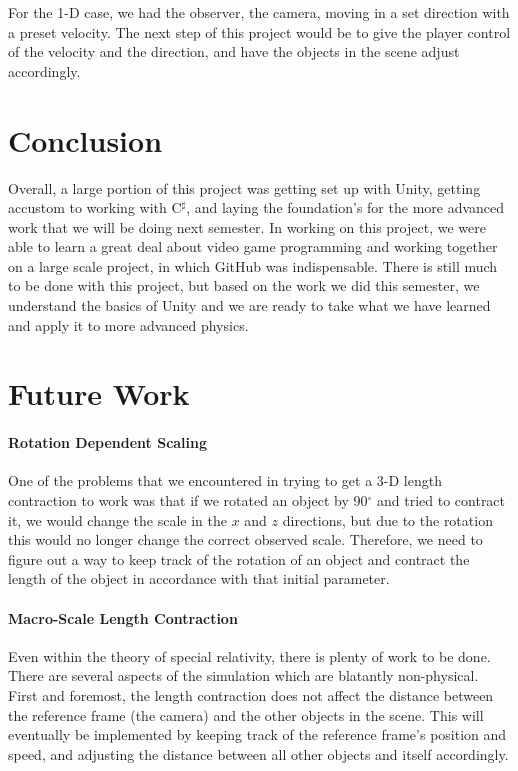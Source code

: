 \documentclass[12pt]{article}
\newcommand{\csharp}{C$^\sharp$}
\begin{document}
For the 1-D case, we had the observer, the camera, moving in a set direction with a preset velocity. The next step of this project would be to give the player control of the velocity and the direction, and have the objects in the scene adjust accordingly.

\section{Conclusion}
Overall, a large portion of this project was getting set up with Unity, getting accustom to working with \csharp{}, and laying the foundation's for the more advanced work that we will be doing next semester. In working on this project, we were able to learn a great deal about video game programming and working together on a large scale project, in which GitHub was indispensable. There is still much to be done with this project, but based on the work we did this semester, we understand the basics of Unity and we are ready to take what we have learned and apply it to more advanced physics. 

\section{Future Work}

\paragraph{Rotation Dependent Scaling} 
One of the problems that we encountered in trying to get a 3-D length contraction to work was that if we rotated an object by 90$^\circ$ and tried to contract it, we would change the scale in the $x$ and $z$ directions, but due to the rotation this would no longer change the correct observed scale. Therefore, we need to figure out a way to keep track of the rotation of an object and contract the length of the object in accordance with that initial parameter. 

\paragraph{Macro-Scale Length Contraction}
Even within the theory of special relativity, there is plenty of work to be done. There are several aspects of the simulation which are blatantly non-physical. First and foremost, the length contraction does not affect the distance between the reference frame (the camera) and the other objects in the scene. This will eventually be implemented by keeping track of the reference frame's position and speed, and adjusting the distance between all other objects and itself accordingly.
\end{document}
